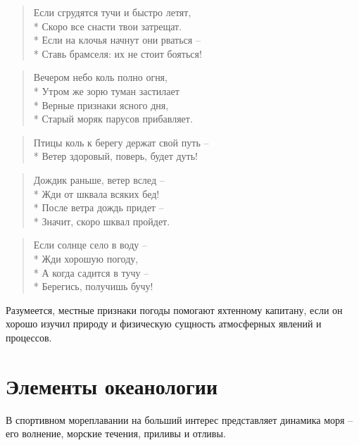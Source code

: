 \documentclass[a4paper, 12pt, twoside, final, book, russian, fittopage, cyremdash]{ncc}
\begin{document}
\begin{multicols}{2}
\begin{quote}
Если сгрудятся тучи и быстро летят, \\*
Скоро все снасти твои затрещат. \\*
Если на клочья начнут они рваться \--- \\*
Ставь брамселя: их не стоит бояться!
\end{quote}

\begin{quote}
Вечером небо коль полно огня, \\*
Утром же зорю туман застилает \\*
Верные признаки ясного дня, \\*
Старый моряк парусов прибавляет.
\end{quote}

\begin{quote}
Птицы коль к берегу держат свой путь \--- \\*
Ветер здоровый, поверь, будет дуть!
\end{quote}

\begin{quote}
Дождик раньше, ветер вслед \--- \\*
Жди от шквала всяких бед! \\*
После ветра дождь придет \--- \\*
Значит, скоро шквал пройдет.
\end{quote}

\begin{quote}
Если солнце село в воду \--- \\*
Жди хорошую погоду, \\*
А когда садится в тучу \--- \\*
Берегись, получишь бучу!
\end{quote}

\normalsize

\end{multicols}

Разумеется, местные признаки погоды помогают яхтенному капитану, если он хорошо изучил природу и физическую сущность атмосферных явлений и процессов.

\section{Элементы океанологии}

В спортивном мореплавании на больший интерес представляет динамика моря \--- его волнение, морские течения, приливы и отливы.
\end{document}
